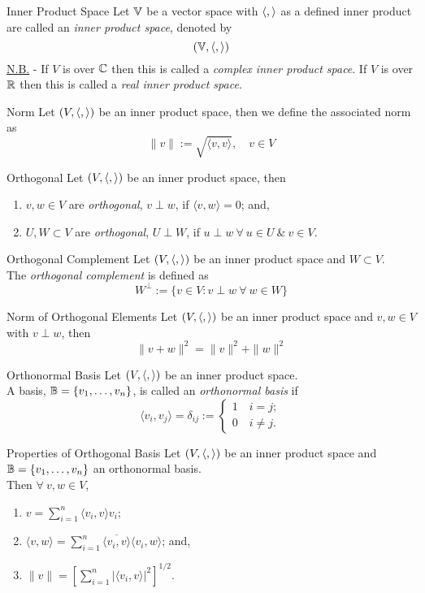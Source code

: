 \documentclass[11pt,a4paper]{article}
\begin{document}
\subtitle{Definition 9.03 - }{Inner Product Space}
Let $\mathbb{V}$ be a vector space with $\langle , \rangle$ as a defined inner product are called an \textit{inner product space}, denoted by
$$(\mathbb{V}, \langle , \rangle)$$
\underline{N.B.} - If $V$ is over $\mathbb{C}$ then this is called a \textit{complex inner product space}. If $V$ is over $\mathbb{R}$ then this is called a \textit{real inner product space}.\\

\subtitle{Definition 9.04 - }{Norm}
Let $( V , \langle , \rangle )$ be an inner product space, then we define the associated norm as
$$\|v\| := \sqrt{\langle v, v \rangle},\quad v \in V$$

\subtitle{Definition 9.05 - }{Orthogonal}
Let $(V , \langle , \rangle)$ be an inner product space, then
\begin{enumerate}[label=\roman*)]
  \item $v, w \in V$ are \textit{orthogonal}, $v \perp w$, if $\langle v, w \rangle = 0$; and,
  \item $U, W \subset V$ are \textit{orthogonal}, $U \perp W$, if $u \perp w\ \forall\ u \in U\ \&\ v \in V$.
\end{enumerate}

\subtitle{Definition 9.06 - }{Orthogonal Complement}
Let $(V, \langle , \rangle)$ be an inner product space and $W \subset V$.\\
The \textit{orthogonal complement} is defined as
$$W^\perp := \{ v \in V : v \perp w\ \forall\ w \in W \}$$

\subtitle{Theorem 9.07 - }{Norm of Orthogonal Elements}
Let $(V, \langle , \rangle)$ be an inner product space and $v, w \in V$ with $v \perp w$, then
$$\|v + w\|^2 = \|v\|^2 + \|w\|^2$$

\subtitle{Definition 9.08 - }{Orthonormal Basis}
Let $(V, \langle , \rangle)$ be an inner product space.\\
A basis, $\mathbb{B} = \{ v_1 , \dots , v_n\}$, is called an \textit{orthonormal basis} if
$$\langle v_i , v_j \rangle = \delta_{ij} := \begin{cases} 1 \quad i = j;\\ 0 \quad i \not = j. \end{cases}$$

\subtitle{Theorem 9.09 - }{Properties of Orthogonal Basis}
Let $(V, \langle , \rangle)$ be an inner product space and $\mathbb{B} = \{ v_1 , \dots , v_n\}$ an orthonormal basis.\\
Then $\forall\ v, w \in V$,
\begin{enumerate}[label=\roman*)]
  \item $v = \sum_{i=1}^n \langle v_i , v \rangle v_i$;
  \item $\langle v , w \rangle = \sum_{i=1}^n \overline{\langle v_i, v \rangle}\langle v_i, w \rangle$; and,
  \item $\|v\| = \left[\sum_{i=1}^n |\langle v_i, v \rangle|^2\right]^{1/2} $.
\end{enumerate}
\end{document}
